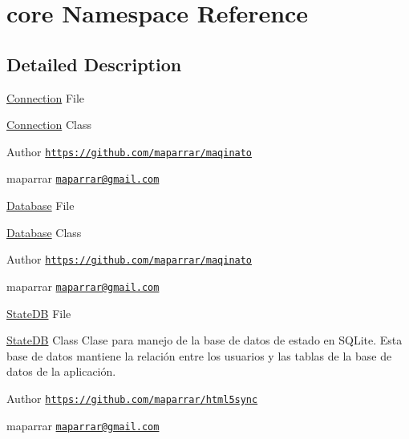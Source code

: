 \hypertarget{namespacecore}{\section{core Namespace Reference}
\label{namespacecore}
}


\subsection{Detailed Description}
\hyperlink{classConnection}{Connection} File

\hyperlink{classConnection}{Connection} Class

\begin{DoxyAuthor}{Author}
\href{https://github.com/maparrar/maqinato}{\tt https\-://github.\-com/maparrar/maqinato} 

maparrar \href{mailto:maparrar@gmail.com}{\tt maparrar@gmail.\-com}
\end{DoxyAuthor}
\hyperlink{classDatabase}{Database} File

\hyperlink{classDatabase}{Database} Class

\begin{DoxyAuthor}{Author}
\href{https://github.com/maparrar/maqinato}{\tt https\-://github.\-com/maparrar/maqinato} 

maparrar \href{mailto:maparrar@gmail.com}{\tt maparrar@gmail.\-com}
\end{DoxyAuthor}
\hyperlink{classStateDB}{State\-D\-B} File 

\hyperlink{classStateDB}{State\-D\-B} Class Clase para manejo de la base de datos de estado en S\-Q\-Lite. Esta base de datos mantiene la relación entre los usuarios y las tablas de la base de datos de la aplicación.

\begin{DoxyAuthor}{Author}
\href{https://github.com/maparrar/html5sync}{\tt https\-://github.\-com/maparrar/html5sync} 

maparrar \href{mailto:maparrar@gmail.com}{\tt maparrar@gmail.\-com}
\end{DoxyAuthor}
